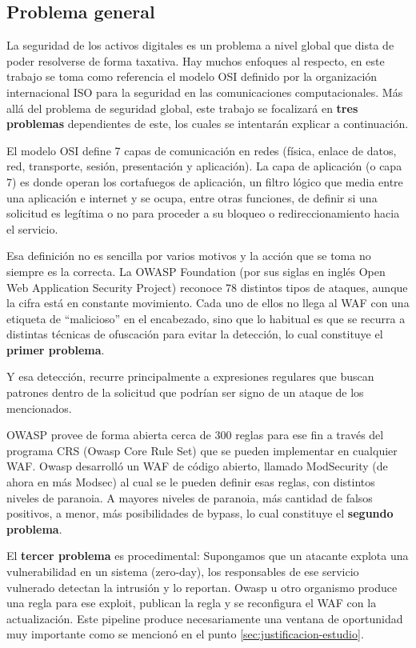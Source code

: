 \documentclass[12pt, a4paper]{article}
\begin{document}
\subsection{Problema general}
\label{sec:definicion-problema}
La seguridad de los activos digitales es un problema a nivel global que dista de poder resolverse de forma taxativa. Hay muchos enfoques al respecto, en este trabajo se toma como referencia el modelo OSI \cite{day1983osi} definido por la organización internacional ISO para la seguridad en las comunicaciones computacionales. Más allá del problema de seguridad global, este trabajo se focalizará en \textbf{tres problemas} dependientes de este, los cuales se intentarán explicar a continuación.

El modelo OSI define 7 capas de comunicación en redes (física, enlace de datos, red, transporte, sesión, presentación y aplicación). La capa de aplicación (o capa 7) es donde operan los cortafuegos de aplicación, un filtro lógico que media entre una aplicación e internet y se ocupa, entre otras funciones, de definir si una solicitud es legítima o no para proceder a su bloqueo o redireccionamiento hacia el servicio.

Esa definición no es sencilla por varios motivos y la acción que se toma no siempre es la correcta. La OWASP Foundation (por sus siglas en inglés Open Web Application Security Project) reconoce 78 distintos tipos de ataques, aunque la cifra está en constante movimiento. Cada uno de ellos no llega al WAF con una etiqueta de \enquote{malicioso} en el encabezado, sino que lo habitual es que se recurra a distintas técnicas de ofuscación para evitar la detección, lo cual constituye el \textbf{primer problema}.

Y esa detección, recurre principalmente a expresiones regulares que buscan patrones dentro de la solicitud que podrían ser signo de un ataque de los mencionados.

 OWASP provee de forma abierta cerca de 300 reglas para ese fin a través del programa CRS (Owasp Core Rule Set) que se pueden implementar en cualquier WAF. Owasp desarrolló un WAF de código abierto, llamado ModSecurity (de ahora en más Modsec) al cual se le pueden definir esas reglas, con distintos niveles de paranoia. A mayores niveles de paranoia, más cantidad de falsos positivos, a menor, más posibilidades de bypass, lo cual constituye el \textbf{segundo problema}.

El \textbf{tercer problema} es procedimental: Supongamos que un atacante explota una vulnerabilidad en un sistema (zero-day), los responsables de ese servicio vulnerado detectan la intrusión y lo reportan. Owasp u otro organismo produce una regla para ese exploit, publican la regla y se reconfigura el WAF con la actualización. Este pipeline produce necesariamente una ventana de oportunidad muy importante como se mencionó en el punto \ref{sec:justificacion-estudio}.
\end{document}
